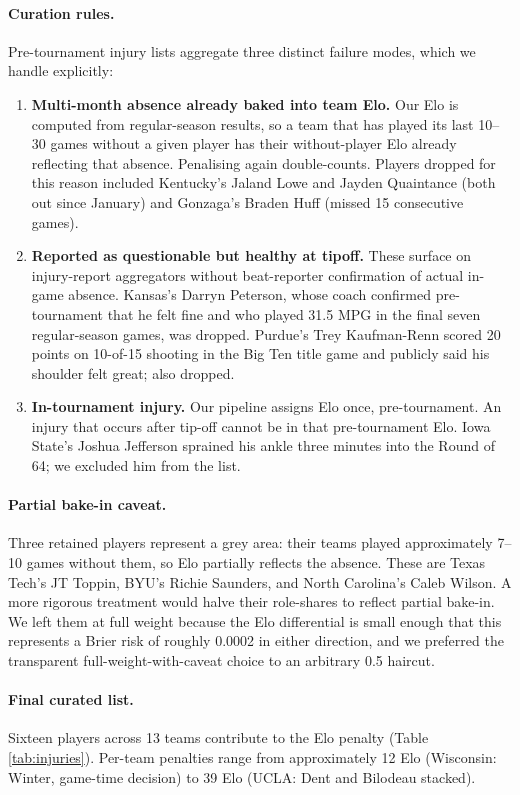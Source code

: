 \documentclass[11pt, a4paper]{article}
\begin{document}
\paragraph{Curation rules.} Pre-tournament injury lists aggregate three distinct failure modes, which we handle explicitly:
\begin{enumerate}[leftmargin=*]
    \item \textbf{Multi-month absence already baked into team Elo.} Our Elo is computed from regular-season results, so a team that has played its last 10--30 games without a given player has their without-player Elo already reflecting that absence. Penalising again double-counts. Players dropped for this reason included Kentucky's Jaland Lowe and Jayden Quaintance (both out since January) and Gonzaga's Braden Huff (missed 15 consecutive games).
    \item \textbf{Reported as questionable but healthy at tipoff.} These surface on injury-report aggregators without beat-reporter confirmation of actual in-game absence. Kansas's Darryn Peterson, whose coach confirmed pre-tournament that he felt fine and who played 31.5 MPG in the final seven regular-season games, was dropped. Purdue's Trey Kaufman-Renn scored 20 points on 10-of-15 shooting in the Big Ten title game and publicly said his shoulder felt great; also dropped.
    \item \textbf{In-tournament injury.} Our pipeline assigns Elo once, pre-tournament. An injury that occurs after tip-off cannot be in that pre-tournament Elo. Iowa State's Joshua Jefferson sprained his ankle three minutes into the Round of 64; we excluded him from the list.
\end{enumerate}

\paragraph{Partial bake-in caveat.} Three retained players represent a grey area: their teams played approximately 7--10 games without them, so Elo partially reflects the absence. These are Texas Tech's JT Toppin, BYU's Richie Saunders, and North Carolina's Caleb Wilson. A more rigorous treatment would halve their role-shares to reflect partial bake-in. We left them at full weight because the Elo differential is small enough that this represents a Brier risk of roughly 0.0002 in either direction, and we preferred the transparent full-weight-with-caveat choice to an arbitrary 0.5 haircut.

\paragraph{Final curated list.} Sixteen players across 13 teams contribute to the Elo penalty (Table \ref{tab:injuries}). Per-team penalties range from approximately 12 Elo (Wisconsin: Winter, game-time decision) to 39 Elo (UCLA: Dent and Bilodeau stacked).
\end{document}
